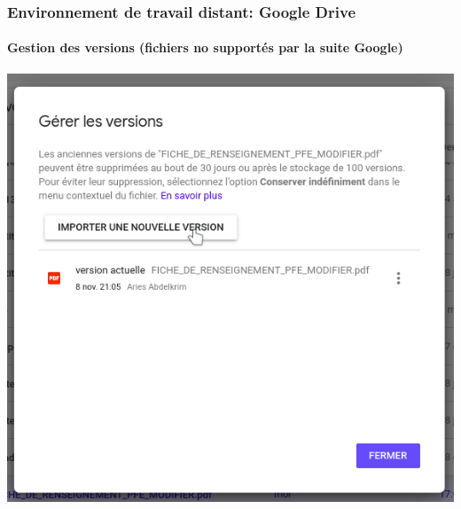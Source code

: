 \documentclass{beamer}
\begin{document}
\begin{frame}
\frametitle{Environnement de travail distant: Google Drive}
\framesubtitle{Gestion des versions (fichiers no supportés par la suite Google) }

\begin{center}
	\includegraphics[height=
	.8\textheight]{../img/Bweb01-environnement/drive-version.png}
\end{center}

\end{frame}
\end{document}
